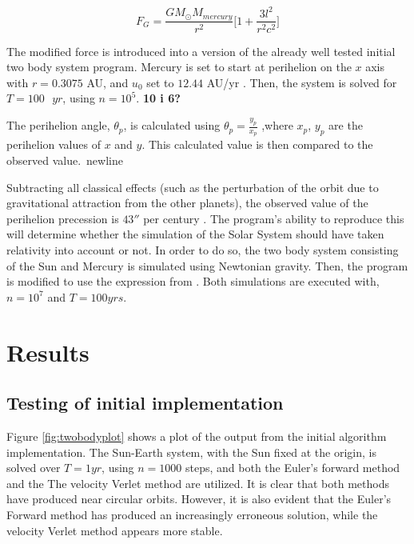\documentclass[%
oneside,                 %
final,                   %
10pt]{article}
\begin{document}
\begin{equation}
F_G=\frac{GM_{\odot}M_{mercury}}{r^2}\Big[1+\frac{3l^2}{r^2c^2}\Big]
\label{eq:M.relativity}
\end{equation}

The modified force is introduced into a version of the already well tested initial two body system program. Mercury is set to start at perihelion on the $x$ axis with $r=0.3075$ AU, and $u_0$ set to $12.44$ AU/yr \cite{HJ-expaper}. Then, the system is solved for $T=100 \text{ }yr$, using $n=10^5$. \textbf{10 i 6?} \newline

The perihelion angle, $\theta_p$, is calculated using $\theta_p=\frac{y_p}{x_p}$ ,where $x_p$, $y_p$ are the perihelion values of $x$ and $y$. This calculated value is then compared to the observed value.\ newline

Subtracting all classical effects (such as the perturbation of the orbit due
to gravitational attraction from the other planets), the observed value of the perihelion
precession is $43''$ per century \cite{HJ-expaper}. The program's ability to reproduce this will determine whether the simulation of the Solar System should have taken relativity into account or not. In order to do so, the two body system consisting of the Sun and Mercury is simulated using Newtonian gravity. Then, the program is modified to use the expression from \label{eq:M.relativity}. Both simulations are executed with, $n=10^7$ and $T=100yrs$.



\section{Results}
\subsection{Testing of initial implementation}
Figure \ref{fig:twobodyplot} shows a plot of the output from the initial algorithm implementation. The Sun-Earth system, with the Sun fixed at the origin, is solved over $T=1 yr$, using $n=1000$ steps, and both the Euler's forward method and the The velocity Verlet method are utilized. It is clear that both methods have produced near circular orbits. However, it is also evident that the Euler's Forward method has produced an increasingly erroneous solution, while the velocity Verlet method appears more stable. \newline
\end{document}
